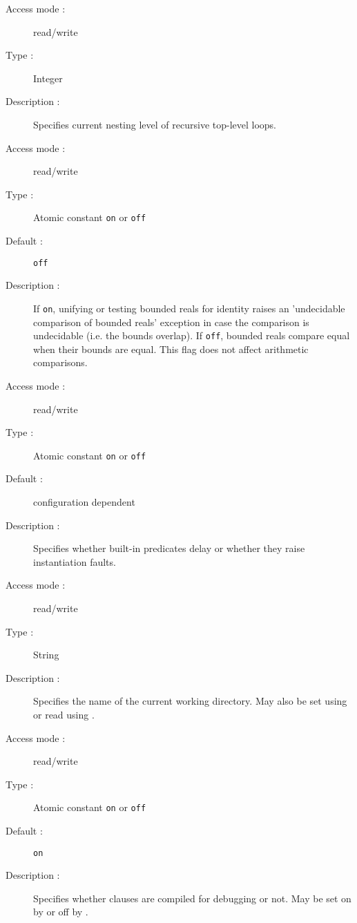 \begin{description}

\begin{description}
\item[Access mode : ] read/write
\item[Type : ] Integer
\item[Description : ] Specifies current nesting level of recursive
top-level loops.
\end{description}

\begin{description}
\item[Access mode : ] read/write
\item[Type : ] Atomic constant {\tt on} or {\tt off}
\item[Default : ] {\tt off}
\item[Description : ]
If {\tt on},  unifying or testing bounded reals for identity raises
an 'undecidable comparison of bounded reals' exception in case the
comparison is undecidable (i.e. the bounds overlap).
If {\tt off}, bounded reals compare equal when their bounds
are equal. This flag does not affect arithmetic comparisons.
\end{description}

\begin{description}
\item[Access mode : ] read/write
\item[Type : ] Atomic constant {\tt on} or {\tt off}
\item[Default : ] configuration dependent
\item[Description : ] Specifies whether built-in predicates delay or whether
they raise instantiation faults.
\end{description}

\begin{description}
\item[Access mode : ] read/write
\item[Type : ] String
\item[Description : ] Specifies the name of the current working directory.
May also be set using  or read using .
\end{description}

\pagebreak[3]
\begin{description}
\item[Access mode : ] read/write
\item[Type : ] Atomic constant {\tt on} or {\tt off}
\item[Default : ] {\tt on}
\item[Description : ] Specifies whether clauses are compiled for debugging or
not. May be set on by  or off by .
\end{description}


\end{description}
